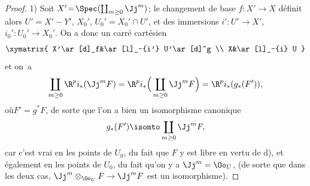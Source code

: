 \begin{proof}
1) Soit $X'\!=\!\Spec(\coprod_{m\geq 0}\Jj^m)$; le changement de base \hbox{$f:X'\!\to\! X$} d\'efinit alors $U'=X'- Y'$, $X_0'$, $U_0'=X_0'\cap U'$, et des immersions $i':U'\to X'$, \hbox{$i_0':U_0'\to X_0'$}. On a donc un carr\'e cart\'esien
\[
\xymatrix{
X'\ar[d]_f&\ar[l]_-{i'} U'\ar[d]^g \\
X&\ar[l]_-{i} U
}
\]
et on~a
\steco
\begin{equation} \label{eq:XII.19}
\coprod_{m\geq 0}\R^pi_\ast(\Jj^mF) = \R^pi_\ast \Big(\coprod_{m\geq 0} \Jj^mF \Big) =\R^pi_\ast (g_\ast(F')),
\end{equation}
o\`u\pageoriginale $F'=g^\ast F$, de sorte que l'on a bien un isomorphisme canonique
\[
g_\ast(F') \isomto \coprod_{m\geq 0}\Jj^mF,
\]
car c'est vrai en les points de $U_0$, du fait que $F$ y est libre en vertu de d), et \'egalement en les points de $U_0$, du fait qu'on y a $\Jj^m=\Oo_U$, (de sorte que dans les deux cas, $\Jj^m\otimes_{\Oo_U}F\to \Jj^mF$ est un isomorphisme).


\end{proof}
